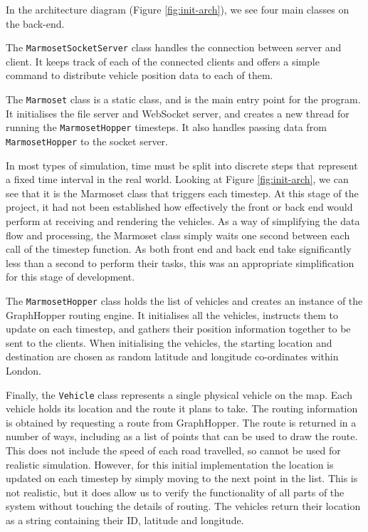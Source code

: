\documentclass[ %
                    author={Alexander Hill},
                supervisor={Dr. Benjamin Sach},
                    degree={MEng},
                     title={MARMOSET},
                  subtitle={Multi-Agent Route Management using Online Simulation for Efficient Transportation},
                      type={research},
                      year={2016} ]{dissertation}
\begin{document}
In the architecture diagram (Figure \ref{fig:init-arch}), we see four main
classes on the back-end.

The \texttt{MarmosetSocketServer} class handles the connection between server
and client.  It keeps track of each of the connected clients and offers a simple
command to distribute vehicle position data to each of them.

The \texttt{Marmoset} class is a static class, and is the main entry point for
the program. It initialises the file server and WebSocket server, and creates a
new thread for running the \texttt{MarmosetHopper} timesteps. It also handles
passing data from \texttt{MarmosetHopper} to the socket server.

In most types of simulation, time must be split into discrete steps that
represent a fixed time interval in the real world. Looking at Figure
\ref{fig:init-arch}, we can see that it is the Marmoset class that triggers each
timestep. At this stage of the project, it had not been established how
effectively the front or back end would perform at receiving and rendering the
vehicles. As a way of simplifying the data flow and processing, the Marmoset
class simply waits one second between each call of the timestep function.  As
both front end and back end take significantly less than a second to perform
their tasks, this was an appropriate simplification for this stage of
development.

The \texttt{MarmosetHopper} class holds the list of vehicles and creates an
instance of the GraphHopper routing engine. It initialises all the vehicles,
instructs them to update on each timestep, and gathers their position
information together to be sent to the clients. When initialising the vehicles,
the starting location and destination are chosen as random latitude and
longitude co-ordinates within London.

Finally, the \texttt{Vehicle} class represents a single physical vehicle on the
map. Each vehicle holds its location and the route it plans to take. The routing
information is obtained by requesting a route from GraphHopper. The route is
returned in a number of ways, including as a list of points that can be used to
draw the route. This does not include the speed of each road travelled, so
cannot be used for realistic simulation. However, for this initial
implementation the location is updated on each timestep by simply moving to the
next point in the list. This is not realistic, but it does allow us to verify
the functionality of all parts of the system without touching the details of
routing. The vehicles return their location as a string containing their ID,
latitude and longitude.
\end{document}

